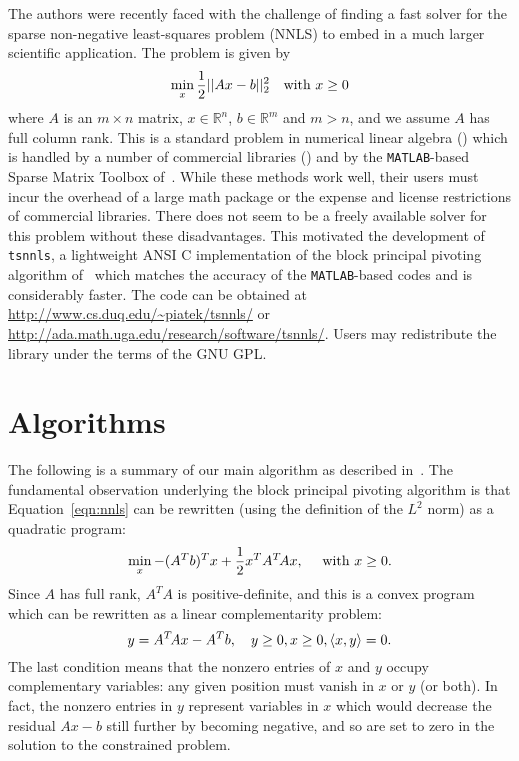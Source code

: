 \documentclass[onecolumn,12pt,tightenlines,amsmath,secnumarabic,%
    floatfix,amssymb,aps,nofootinbib,letterpaper, showkeys]{revtex4}
\def\marginpar#1{}   %
\let\lbl=\label
\def\label#1{\lbl{#1}\ifinner\else\marginpar{\ref{#1} #1}\ignorespaces\fi}
\begin{document}
The authors were recently faced with the challenge of finding 
a fast solver for the sparse non-negative least-squares problem (NNLS) to embed
in a much larger scientific application. The problem is given by 
\begin{equation}
\label{eqn:nnls}
\min_x \frac{1}{2}|| Ax - b ||^2_2 \quad \mbox{with } x \geq 0
\end{equation}
where $A$ is an $m \times n$ matrix, $x \in \mathbb{R}^n$, $b \in \mathbb{R}^m$ and $m > n$, and
we assume $A$ has full column rank. This is a standard problem in numerical linear algebra (\cite{MR96d:65067,MR97g:65004}) which is handled by a number of commercial libraries (\cite{MR2000h:90104,knitro,TOMLAB}) and by the \texttt{MATLAB}-based Sparse Matrix Toolbox of~\cite{sls}. While these methods work well, their users must incur the overhead of a large math package or the expense and license restrictions of commercial libraries. There does not seem to be a freely available solver for this problem without these disadvantages. This motivated the development of \texttt{tsnnls}, a lightweight ANSI C implementation of the block principal pivoting algorithm of~\cite{MR95a:90059} which matches the accuracy of the \texttt{MATLAB}-based codes and is considerably faster.
The code can be obtained at \url{http://www.cs.duq.edu/~piatek/tsnnls/} or
 \url{http://ada.math.uga.edu/research/software/tsnnls/}.  Users may redistribute the library under the terms of the GNU GPL.

\section{Algorithms}
\label{sec:algorithms}

The following is a summary of our main algorithm as described in~\cite{MR95a:90059}. The fundamental observation underlying the block principal pivoting algorithm is that Equation~\ref{eqn:nnls} can be rewritten (using the definition of the $L^2$ norm) as a quadratic program:
\begin{equation}
\label{eqn:cqpr}
\min_x \mathord{-}(A^T b)^T x + \frac{1}{2} x^T A^T\!A x , \quad  \mbox{ with } x \geq 0.
\end{equation}
Since $A$ has full rank, $A^T\!A$ is positive-definite, and this is a convex program
which can be rewritten as a linear complementarity problem:
\begin{equation}
\label{eqn:lcp}
y = A^T\! A x - A^T b, \quad y \geq 0, x \geq 0, \left< x, y \right> = 0.
\end{equation}
The last condition means that the nonzero entries of $x$ and $y$ occupy complementary
variables: any given position must vanish in $x$ or $y$ (or both). In fact, the nonzero entries in $y$ represent variables in $x$ which would decrease the residual $Ax - b$ still further by becoming negative, and so are set to zero in the solution to the constrained problem. 
\end{document}
